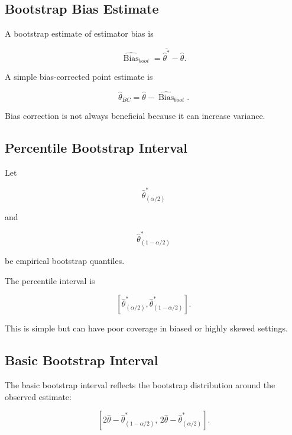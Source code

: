 \subsection{Bootstrap Bias Estimate}
\label{subsec:bootstrap-bias-estimate}

A bootstrap estimate of estimator bias is

\[
\boxed{
\widehat{\operatorname{Bias}}_{boot}
=
\overline{\widehat{\theta}^*}
-
\widehat{\theta}.
}
\]

A simple bias-corrected point estimate is

\[
\boxed{
\widehat{\theta}_{BC}
=
\widehat{\theta}
-
\widehat{\operatorname{Bias}}_{boot}.
}
\]

Bias correction is not always beneficial because it can increase
variance.

\subsection{Percentile Bootstrap Interval}
\label{subsec:percentile-bootstrap}

Let

\[
\widehat{\theta}^{*}_{(\alpha/2)}
\]

and

\[
\widehat{\theta}^{*}_{(1-\alpha/2)}
\]

be empirical bootstrap quantiles.

The percentile interval is

\[
\boxed{
\left[
\widehat{\theta}^{*}_{(\alpha/2)},
\widehat{\theta}^{*}_{(1-\alpha/2)}
\right].
}
\]

This is simple but can have poor coverage in biased or highly skewed
settings.

\subsection{Basic Bootstrap Interval}
\label{subsec:basic-bootstrap-interval}

The basic bootstrap interval reflects the bootstrap distribution around
the observed estimate:

\[
\boxed{
\left[
2\widehat{\theta}
-
\widehat{\theta}^{*}_{(1-\alpha/2)},
\,
2\widehat{\theta}
-
\widehat{\theta}^{*}_{(\alpha/2)}
\right].
}
\]

